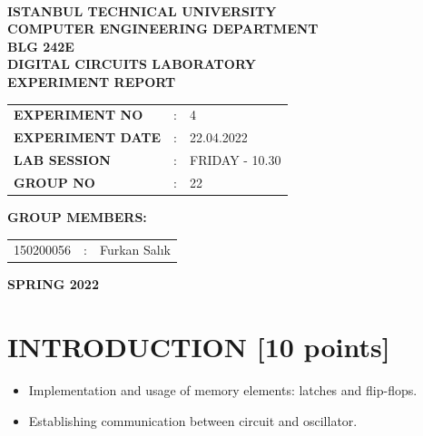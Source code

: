 \documentclass[pdftex,12pt,a4paper]{article}
\begin{document}
\begin{titlepage}
\begin{center}
\textbf{}\\
\textbf{\Large{ISTANBUL TECHNICAL UNIVERSITY}}\\
\vspace{0.5cm}
\textbf{\Large{COMPUTER ENGINEERING DEPARTMENT}}\\
\vspace{2cm}
\textbf{\Large{BLG 242E\\ DIGITAL CIRCUITS LABORATORY\\ EXPERIMENT REPORT}}\\
\vspace{2.8cm}
\begin{table}[ht]
\centering
\Large{
\begin{tabular}{lcl}
\textbf{EXPERIMENT NO}  & : & 4 \\
\textbf{EXPERIMENT DATE}  & : & 22.04.2022 \\
\textbf{LAB SESSION}  & : & FRIDAY - 10.30 \\
\textbf{GROUP NO}  & : & 22 \\
\end{tabular}}
\end{table}
\vspace{1cm}
\textbf{\Large{GROUP MEMBERS:}}\\
\begin{table}[ht]
\centering
\Large{
\begin{tabular}{rcl}
150200056  & : & Furkan Salık\\
\end{tabular}}
\end{table}
\vspace{2.8cm}
\textbf{\Large{SPRING 2022}}

\end{center}

\end{titlepage}

\thispagestyle{empty}
\setcounter{tocdepth}{4}
\tableofcontents
\clearpage

\setcounter{page}{1}

\section{INTRODUCTION [10 points]}

\begin{itemize}
    \item Implementation and usage of memory elements: latches and flip-flops.
    \item Establishing communication between circuit and oscillator.
\end{itemize}
\end{document}
